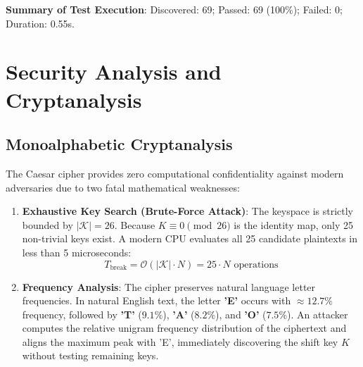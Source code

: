 \documentclass[12pt,a4paper]{report}
\begin{document}
\textbf{Summary of Test Execution}: Discovered: 69; Passed: 69 (100\%); Failed: 0; Duration: 0.55s.

\newpage

\chapter{Security Analysis and Cryptanalysis}

\section{Monoalphabetic Cryptanalysis}
The Caesar cipher provides zero computational confidentiality against modern adversaries due to two fatal mathematical weaknesses:
\begin{enumerate}
    \item \textbf{Exhaustive Key Search (Brute-Force Attack)}: The keyspace is strictly bounded by $|\mathcal{K}| = 26$. Because $K \equiv 0 \pmod{26}$ is the identity map, only 25 non-trivial keys exist. A modern CPU evaluates all 25 candidate plaintexts in less than 5 microseconds:
    \begin{equation}
        T_{\text{break}} = \mathcal{O}(|\mathcal{K}| \cdot N) = 25 \cdot N \text{ operations}
    \end{equation}
    \item \textbf{Frequency Analysis}: The cipher preserves natural language letter frequencies. In natural English text, the letter \textbf{'E'} occurs with $\approx 12.7\%$ frequency, followed by \textbf{'T'} ($9.1\%$), \textbf{'A'} ($8.2\%$), and \textbf{'O'} ($7.5\%$). An attacker computes the relative unigram frequency distribution of the ciphertext and aligns the maximum peak with 'E', immediately discovering the shift key $K$ without testing remaining keys.
\end{enumerate}
\end{document}
